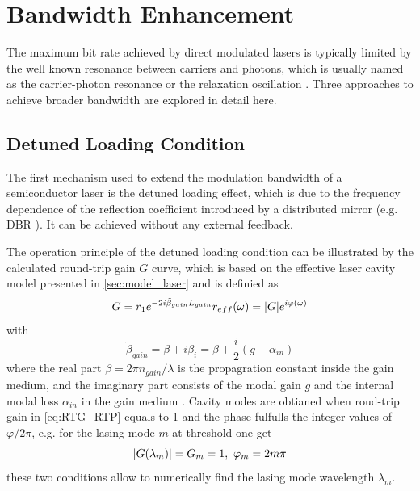 \section{Bandwidth Enhancement}\label{sec:bandwidth_enhancement}
The maximum bit rate achieved by direct modulated lasers is typically limited by the well known resonance between carriers and photons, which is usually named as the carrier-photon resonance or the relaxation oscillation \cite{coldren2012diode}. Three approaches to achieve broader bandwidth are explored in detail here. 

\subsection{Detuned Loading Condition}\label{subsec:detuned_loading}
The first mechanism used to extend the modulation bandwidth of a semiconductor laser is the detuned loading effect, which is due to the frequency dependence of the reflection coefficient introduced by a distributed mirror (e.g. DBR \cite{feiste1998optimization, kjebon1997two, chacinski2010impact}). It can be achieved without any external feedback. 

The operation principle of the detuned loading condition can be illustrated by the calculated round-trip gain $G$ curve, which is based on the effective laser cavity model presented in \autoref{sec:model_laser} and is definied as \cite{petermann2012laser, vallone2011enhanced}
\begin{equation}
    G=r_1e^{-2i\tilde{\beta}_{gain}L_{gain}}r_{eff}(\omega)=\abs{G}e^{i\varphi(\omega)}
    \label{eq:RTG_RTP}
\end{equation}
with \cite{coldren2012diode}
\begin{equation}
    \tilde{\beta}_{gain}=\beta+i\beta_{i}=\beta+\frac{i}{2}(g-\alpha_{in})
    \label{eq:beta_gain}
\end{equation}
where the real part $\beta=2\pi n_{gain}/\lambda$ is the propagration constant inside the gain medium, and the imaginary part consists of the modal gain $g$ and the internal modal loss $\alpha_{in}$ in the gain medium \cite{coldren2012diode}. Cavity modes are obtianed when roud-trip gain in \autoref{eq:RTG_RTP} equals to 1 and the phase fulfulls the integer values of $\varphi/2\pi$, e.g. for the lasing mode $m$ at threshold one get \cite{vallone2011enhanced}
\begin{equation}
    \abs{G(\lambda_m)}=G_m=1,\ \varphi_m=2m\pi
    \label{eq:lasing_condition}
\end{equation}
these two conditions allow to numerically find the lasing mode wavelength $\lambda_m$.

